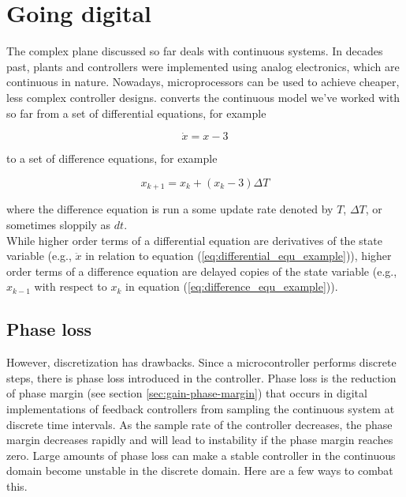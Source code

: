 \section{Going digital}

The complex plane discussed so far deals with continuous \glspl{system}. In
decades past, \glspl{plant} and controllers were implemented using analog
electronics, which are continuous in nature. Nowadays, microprocessors can be
used to achieve cheaper, less complex controller designs.
 converts the continuous model we've
worked with so far from a set of differential equations, for example

\begin{equation}
  \dot{x} = x - 3 \label{eq:differential_equ_example}
\end{equation}

to a set of difference equations, for example

\begin{equation}
  x_{k+1} = x_k + (x_k - 3) \Delta T \label{eq:difference_equ_example}
\end{equation}

where the difference equation is run a some update rate denoted by $T$,
$\Delta T$, or sometimes sloppily as $dt$. \\

While higher order terms of a differential equation are derivatives of the state
variable (e.g., $\ddot{x}$ in relation to equation
(\ref{eq:differential_equ_example})), higher order terms of a difference
equation are delayed copies of the state variable (e.g., $x_{k-1}$ with respect
to $x_k$ in equation (\ref{eq:difference_equ_example})).

\subsection{Phase loss}

However, \gls{discretization} has drawbacks. Since a microcontroller performs
discrete steps, there is phase loss introduced in the controller. Phase loss is
the reduction of phase margin (see section \ref{sec:gain-phase-margin}) that
occurs in digital implementations of feedback controllers from sampling the
continuous system at discrete time intervals. As the sample rate of the
controller decreases, the phase margin decreases rapidly and will lead to
instability if the phase margin reaches zero. Large amounts of phase loss can
make a stable controller in the continuous domain become unstable in the
discrete domain. Here are a few ways to combat this.


